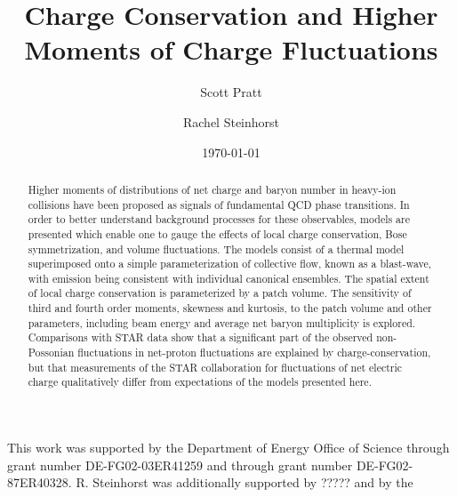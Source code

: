\documentclass[aps,prc,nofootinbib,showpacs,superscriptaddress,groupedaddress]{revtex4-1}
\begin{document}
\title{Charge Conservation and Higher Moments of Charge Fluctuations}
\author{Scott Pratt}
\author{Rachel Steinhorst}
\date{\today}

\pacs{}

\begin{abstract}
Higher moments of distributions of net charge and baryon number in heavy-ion collisions have been proposed as signals of fundamental QCD phase transitions. In order to better understand background processes for these observables, models are presented which enable one to gauge the effects of local charge conservation, Bose symmetrization, and volume fluctuations. The models consist of a thermal model superimposed onto a simple parameterization of collective flow, known as a blast-wave, with emission being consistent with individual canonical ensembles. The spatial extent of local charge conservation is parameterized by a patch volume. The sensitivity of third and fourth order moments, skewness and kurtosis, to the patch volume and other parameters, including beam energy and average net baryon multiplicity is explored. Comparisons with STAR data show that a significant part of the observed non-Possonian fluctuations in net-proton fluctuations are explained by charge-conservation, but that measurements of the STAR collaboration for fluctuations of net electric charge qualitatively differ from expectations of the models presented here.
\end{abstract}

\maketitle

















\begin{acknowledgments}
This work was supported by the Department of Energy Office of Science through grant number DE-FG02-03ER41259 and through grant number DE-FG02-87ER40328. R. Steinhorst was additionally supported by ????? and by the 
\end{acknowledgments}


\end{document}
